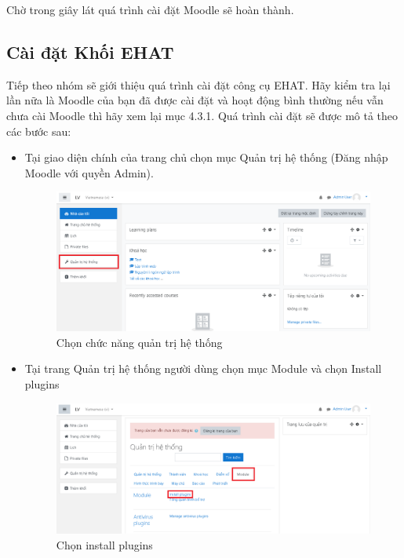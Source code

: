 \vskip 7cm
Chờ trong giây lát quá trình cài đặt Moodle sẽ hoàn thành.

\subsection*{Cài đặt Khối EHAT}
Tiếp theo nhóm sẽ giới thiệu quá trình cài đặt công cụ EHAT. Hãy kiểm tra lại lần nữa là Moodle của bạn đã được cài đặt và hoạt động bình thường nếu vẫn chưa cài Moodle thì hãy xem lại mục 4.3.1. Quá trình cài đặt sẽ được mô tả theo các bước sau:

\begin{itemize}
	\item Tại giao diện chính của trang chủ chọn mục Quản trị hệ thống (Đăng nhập Moodle với quyền Admin).
	
	\begin{center}
		\begin{figure}[htp]
			\begin{center}
				\includegraphics[width=1\linewidth]{img/6}
			\end{center}
			\caption{Chọn chức năng quản trị hệ thống}
			\label{refhinh36}
		\end{figure}
	\end{center}
	
	\item Tại trang Quản trị hệ thống người dùng chọn mục Module và chọn Install plugins
	
	\begin{center}
		\begin{figure}[htp]
			\begin{center}
				\includegraphics[width=1\linewidth]{img/7}
			\end{center}
			\caption{Chọn install plugins}
			\label{refhinh37}
		\end{figure}
	\end{center}
	

\end{itemize}
